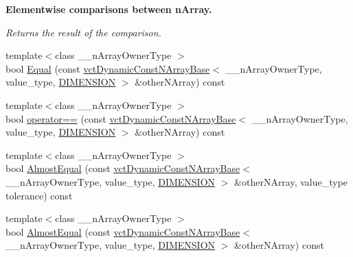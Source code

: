 \begin{Indent}{\bf Elementwise comparisons between n\-Array.}\par
{\em Returns the result of the comparison. }\begin{DoxyCompactItemize}
\item 
{\footnotesize template$<$class \-\_\-\-\_\-n\-Array\-Owner\-Type $>$ }\\bool \hyperlink{classvct_dynamic_const_n_array_base_aa58ee50fa83ed2ffa6e7feb113374b90}{Equal} (const \hyperlink{classvct_dynamic_const_n_array_base}{vct\-Dynamic\-Const\-N\-Array\-Base}$<$ \-\_\-\-\_\-n\-Array\-Owner\-Type, value\-\_\-type, \hyperlink{classvct_dynamic_const_n_array_base_a815ac316ebc1bb2ab1969d307549826faf759c9ab831ff929b89af4ea2865a378}{D\-I\-M\-E\-N\-S\-I\-O\-N} $>$ \&other\-N\-Array) const 
\item 
{\footnotesize template$<$class \-\_\-\-\_\-n\-Array\-Owner\-Type $>$ }\\bool \hyperlink{classvct_dynamic_const_n_array_base_a173df38e1b064aa9c89e1c46e903afbf}{operator==} (const \hyperlink{classvct_dynamic_const_n_array_base}{vct\-Dynamic\-Const\-N\-Array\-Base}$<$ \-\_\-\-\_\-n\-Array\-Owner\-Type, value\-\_\-type, \hyperlink{classvct_dynamic_const_n_array_base_a815ac316ebc1bb2ab1969d307549826faf759c9ab831ff929b89af4ea2865a378}{D\-I\-M\-E\-N\-S\-I\-O\-N} $>$ \&other\-N\-Array) const 
\item 
{\footnotesize template$<$class \-\_\-\-\_\-n\-Array\-Owner\-Type $>$ }\\bool \hyperlink{classvct_dynamic_const_n_array_base_a53bdb4e9abe242d6cbaec4792d353122}{Almost\-Equal} (const \hyperlink{classvct_dynamic_const_n_array_base}{vct\-Dynamic\-Const\-N\-Array\-Base}$<$ \-\_\-\-\_\-n\-Array\-Owner\-Type, value\-\_\-type, \hyperlink{classvct_dynamic_const_n_array_base_a815ac316ebc1bb2ab1969d307549826faf759c9ab831ff929b89af4ea2865a378}{D\-I\-M\-E\-N\-S\-I\-O\-N} $>$ \&other\-N\-Array, value\-\_\-type tolerance) const 
\item 
{\footnotesize template$<$class \-\_\-\-\_\-n\-Array\-Owner\-Type $>$ }\\bool \hyperlink{classvct_dynamic_const_n_array_base_a93edefb84318db443a3aa416b08b12e8}{Almost\-Equal} (const \hyperlink{classvct_dynamic_const_n_array_base}{vct\-Dynamic\-Const\-N\-Array\-Base}$<$ \-\_\-\-\_\-n\-Array\-Owner\-Type, value\-\_\-type, \hyperlink{classvct_dynamic_const_n_array_base_a815ac316ebc1bb2ab1969d307549826faf759c9ab831ff929b89af4ea2865a378}{D\-I\-M\-E\-N\-S\-I\-O\-N} $>$ \&other\-N\-Array) const 
\item 

\end{DoxyCompactItemize}
\end{Indent}
